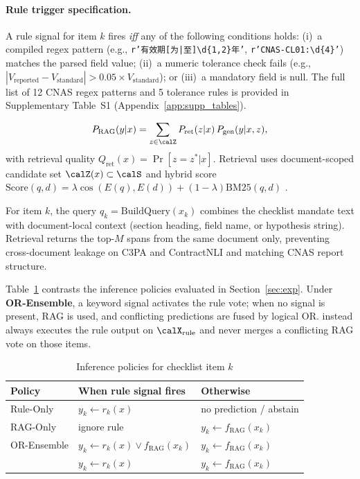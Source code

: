 \paragraph{Rule trigger specification.}
A rule signal for item $k$ fires \emph{iff} any of the following conditions holds: (i)~a compiled regex pattern (e.g., \texttt{r'有效期[为|至]\textbackslash d\{1,2\}年'}, \texttt{r'CNAS-CL01:\textbackslash d\{4\}'}) matches the parsed field value; (ii)~a numeric tolerance check fails (e.g., $|V_{\mathrm{reported}} - V_{\mathrm{standard}}| > 0.05 \times V_{\mathrm{standard}}$); or (iii)~a mandatory field is null. The full list of 12 CNAS regex patterns and 5 tolerance rules is provided in Supplementary Table~S1 (Appendix~\ref{app:supp_tables}).

\begin{definition}
\begin{equation}
P_{\mathrm{RAG}}(y|x)=\sum_{z\in\calZ} P_{\mathrm{ret}}(z|x)\,P_{\mathrm{gen}}(y|x,z),
\end{equation}
with retrieval quality $Q_{\mathrm{ret}}(x)=\Pr[z=z^*|x]$. Retrieval uses document-scoped candidate set $\calZ(x)\subset\calS$ and hybrid score
$\mathrm{Score}(q,d)=\lambda\cos(E(q),E(d))+(1-\lambda)\mathrm{BM25}(q,d)$ \cite{robertson2009bm25,karpukhin2020dpr,lewis2020rag}.
\end{definition}

For item $k$, the query $q_k=\mathrm{BuildQuery}(x_k)$ combines the checklist mandate text with document-local context (section heading, field name, or hypothesis string). Retrieval returns the top-$M$ spans from the same document only, preventing cross-document leakage on C3PA and ContractNLI and matching CNAS report structure.

Table~\ref{tab:baselines} contrasts the inference policies evaluated in Section~\ref{sec:exp}. Under \textbf{OR-Ensemble}, a keyword signal activates the rule vote; when no signal is present, RAG is used, and conflicting predictions are fused by logical OR. \textbf{\HRAG{}} instead always executes the rule output on $\calX_{\mathrm{rule}}$ and never merges a conflicting RAG vote on those items.

\begin{table}[t]
\centering
\caption{Inference policies for checklist item $k$}
\label{tab:baselines}
\small
\begin{tabular}{@{}p{2.1cm}p{4.6cm}p{4.8cm}@{}}
\toprule
Policy & When rule signal fires & Otherwise \\
\midrule
Rule-Only    & $y_k \leftarrow r_k(x)$ & no prediction / abstain \\
RAG-Only     & ignore rule            & $y_k \leftarrow f_{\mathrm{RAG}}(x_k)$ \\
OR-Ensemble  & $y_k \leftarrow r_k(x) \lor f_{\mathrm{RAG}}(x_k)$ & $y_k \leftarrow f_{\mathrm{RAG}}(x_k)$ \\
\textbf{\HRAG{}} & $y_k \leftarrow r_k(x)$ & $y_k \leftarrow f_{\mathrm{RAG}}(x_k)$ \\
\bottomrule
\end{tabular}
\end{table}

